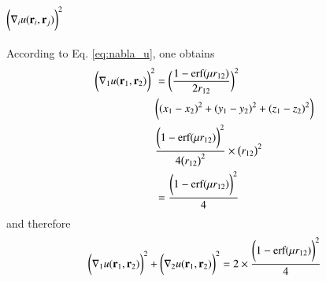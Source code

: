 \documentclass[aip,jcp,reprint,noshowkeys,superscriptaddress]{revtex4-1}
\newcommand{\br}[0]{{\bf {r}}}
\begin{document}
\subsection{$\bigg(\nabla_i u(\br{}_i,\br{}_j)\bigg)^2$}
According to Eq. \eqref{eq:nabla_u}, one obtains 
\begin{equation}
 \label{eq:nabla_u2_0}
 \begin{aligned}
 \bigg(\nabla_1 u(\br{}_1,\br{}_2)\bigg)^2 & = \bigg( \frac{1 - \text{erf}(\mu r_{12})}{2 r_{12}} \bigg)^2\\
 & \bigg( (x_1 - x_2)^2 + (y_1 - y_2)^2 + (z_1 - z_2)^2 \bigg) \\
                                           &  \frac{\bigg(1 - \text{erf}(\mu r_{12}) \bigg)^2}{4 \big(r_{12}\big)^2} \times \big(r_{12}\big)^2 \\
                                           & = \frac{\bigg(1 - \text{erf}(\mu r_{12}) \bigg)^2}{4}
 \end{aligned}
\end{equation}
and therefore 
\begin{equation}
 \label{eq:nabla_u2}
 \bigg(\nabla_1 u(\br{}_1,\br{}_2)\bigg)^2  + \bigg(\nabla_2 u(\br{}_1,\br{}_2)\bigg)^2 = 2 \times \frac{\bigg(1 - \text{erf}(\mu r_{12}) \bigg)^2}{4}
\end{equation}
\end{document}
